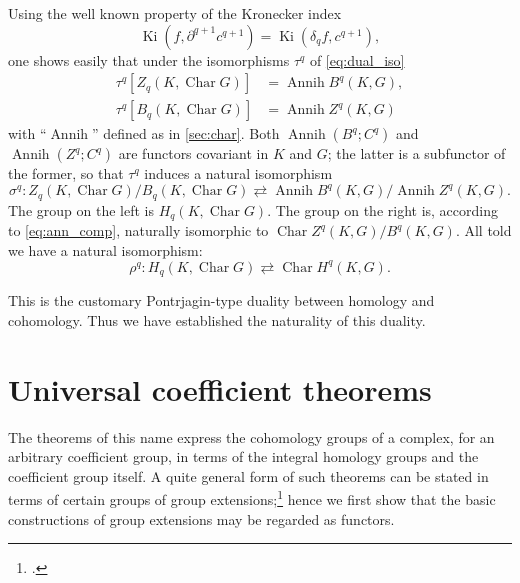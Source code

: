 \documentclass[11pt,a4paper]{report}
\DeclareMathOperator{\chr}{Char}
\DeclareMathOperator{\an}{Annih}
\DeclareMathOperator{\ki}{Ki}
\begin{document}
Using the well known property of the Kronecker index
\begin{equation*}
	\ki(f,\partial^{q+1} c^{q+1}) = \ki(\delta_q f,c^{q+1}),
\end{equation*}
one shows easily that under the isomorphisms $\tau^q$ of \cref{eq:dual_iso}
\begin{align*}
	\tau^q[Z_q(K,\chr G)]&= \an B^q(K,G),\\
	\tau^q[B_q(K,\chr G)]&= \an Z^q(K,G)
\end{align*}
with ``$\an$'' defined as in \cref{sec:char}. Both $\an (B^q;C^q)$ and $\an (Z^q;C^q)$ are functors
covariant in $K$ and $G$; the latter is a subfunctor of the former, so that $\tau^q$ induces a natural
isomorphism
\begin{equation*}
	\sigma^q:Z_q(K,\chr G)/B_q(K,\chr G)\rightleftarrows\an B^q(K,G)/\an Z^q(K,G).
\end{equation*}
The group on the left is $H_q(K,\chr G)$. The group on the right is, according to \cref{eq:ann_comp}, 
naturally isomorphic to $\chr Z^q(K,G)/B^q(K,G)$. All told we have a natural isomorphism:
\begin{equation*}
	\rho^q:H_q(K,\chr G)\rightleftarrows\chr H^q(K,G).
\end{equation*}

This is the customary Pontrjagin\hyp{}type duality between homology and cohomology. Thus we have 
established the naturality of this duality.

\section{Universal coefficient theorems}\label{sec:uni-coeff}
The theorems of this name express the cohomology groups of a complex, for an arbitrary coefficient
group, in terms of the integral homology groups and the coefficient group itself. A quite general
form of such theorems can be stated in terms of certain groups of group extensions;\footcite[757--831]{eilenberg42}
hence we first show that the basic constructions of group extensions may be regarded as functors.
\end{document}
